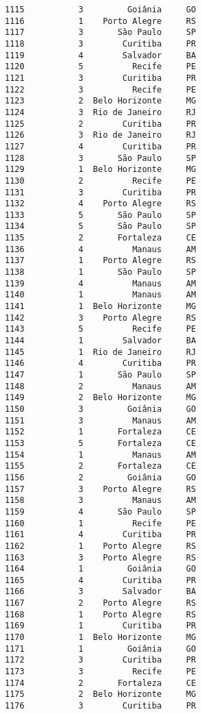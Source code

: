 \documentclass[11pt]{article}
\begin{document}
\begin{Verbatim}[commandchars=\\\{\}]
1115           3         Goiânia     GO  
1116           1    Porto Alegre     RS  
1117           3       São Paulo     SP  
1118           3        Curitiba     PR  
1119           4        Salvador     BA  
1120           5          Recife     PE  
1121           3        Curitiba     PR  
1122           3          Recife     PE  
1123           2  Belo Horizonte     MG  
1124           3  Rio de Janeiro     RJ  
1125           2        Curitiba     PR  
1126           3  Rio de Janeiro     RJ  
1127           4        Curitiba     PR  
1128           3       São Paulo     SP  
1129           1  Belo Horizonte     MG  
1130           2          Recife     PE  
1131           3        Curitiba     PR  
1132           4    Porto Alegre     RS  
1133           5       São Paulo     SP  
1134           5       São Paulo     SP  
1135           2       Fortaleza     CE  
1136           4          Manaus     AM  
1137           1    Porto Alegre     RS  
1138           1       São Paulo     SP  
1139           4          Manaus     AM  
1140           1          Manaus     AM  
1141           1  Belo Horizonte     MG  
1142           3    Porto Alegre     RS  
1143           5          Recife     PE  
1144           1        Salvador     BA  
1145           1  Rio de Janeiro     RJ  
1146           4        Curitiba     PR  
1147           1       São Paulo     SP  
1148           2          Manaus     AM  
1149           2  Belo Horizonte     MG  
1150           3         Goiânia     GO  
1151           3          Manaus     AM  
1152           1       Fortaleza     CE  
1153           5       Fortaleza     CE  
1154           1          Manaus     AM  
1155           2       Fortaleza     CE  
1156           2         Goiânia     GO  
1157           3    Porto Alegre     RS  
1158           3          Manaus     AM  
1159           4       São Paulo     SP  
1160           1          Recife     PE  
1161           4        Curitiba     PR  
1162           1    Porto Alegre     RS  
1163           3    Porto Alegre     RS  
1164           1         Goiânia     GO  
1165           4        Curitiba     PR  
1166           3        Salvador     BA  
1167           2    Porto Alegre     RS  
1168           1    Porto Alegre     RS  
1169           1        Curitiba     PR  
1170           1  Belo Horizonte     MG  
1171           1         Goiânia     GO  
1172           3        Curitiba     PR  
1173           3          Recife     PE  
1174           2       Fortaleza     CE  
1175           2  Belo Horizonte     MG  
1176           3        Curitiba     PR  

\end{Verbatim}
\end{document}
